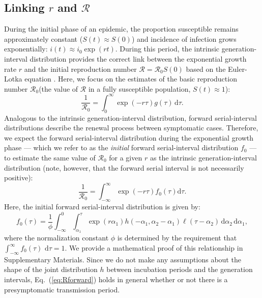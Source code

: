 \documentclass[12pt]{article}
\newcommand{\eref}[1]{Eq.~(\ref{eq:#1})}
\newcommand{\Rx}[1]{\ensuremath{{\mathcal R}_{#1}}\xspace}
\newcommand{\Ro}{\Rx{0}}
\newcommand{\RR}{\ensuremath{{\mathcal R}}\xspace}
\newcommand{\dd}[1]{\ensuremath{\, \mathrm{d}#1}}
\newcommand{\dtau}{\dd{\tau}}
\newcommand{\pinf}{\ensuremath{\alpha_1}} %
\newcommand{\sinf}{\ensuremath{\alpha_2}} %
\newcommand{\idist}{\ell} %
\begin{document}
\subsection{Linking $r$ and \RR}

During the initial phase of an epidemic, the proportion susceptible remains approximately constant ($S(t) \approx S(0)$) and incidence of infection grows exponentially: $i(t) \approx i_0\exp(rt)$.
During this period, the intrinsic generation-interval distribution provides the correct link between the exponential growth rate $r$ and the initial reproduction number $\RR=\Ro S(0)$ based on the Euler-Lotka equation \citep{wallinga2007generation}.
Here, we focus on the estimates of the basic reproduction number \Ro (the value of \RR in a fully susceptible population, $S(t) \approx 1$):
\begin{equation}
\frac{1}{\Ro} = \int_0^\infty \exp(-r\tau) g(\tau) \dtau.
\label{eq:Rgen}
\end{equation}
Analogous to the intrinsic generation-interval distribution, 
forward serial-interval distributions describe the renewal process between symptomatic cases.
Therefore, we expect the forward serial-interval distribution during the exponential growth phase --- which we refer to as the \emph{initial} forward serial-interval distribution $f_0$ --- to estimate the same value of \Ro for a given $r$ as the intrinsic generation-interval distribution (note, however, that the forward serial interval is not necessarily positive):
\begin{equation}
\frac{1}{\Ro} = \int_{-\infty}^\infty \exp(-r\tau) f_{0}(\tau) \mathrm{d} \tau.
\label{eq:Rforward}
\end{equation}
Here, the initial forward serial-interval distribution is given by:
\begin{equation}
f_{0}(\tau) = \frac{1}{\phi} \int_{-\infty}^{0} \int_{\pinf}^{\tau} \exp(r \pinf) h(-\pinf, \sinf - \pinf) \idist(\tau - \sinf) \, \mathrm{d}\sinf\,\mathrm{d}\pinf,
\label{eq:initialSI}
\end{equation}
where the normalization constant $\phi$ is determined by the requirement that $\int_{-\infty}^\infty f_{0}(\tau)\,\dtau=1$.
We provide a mathematical proof of this relationship in Supplementary Materials.
Since we do not make any assumptions about the shape of the joint distribution $h$ between incubation periods and the generation intervals, \eref{Rforward} holds in general whether or not there is a presymptomatic transmission period.
\end{document}
